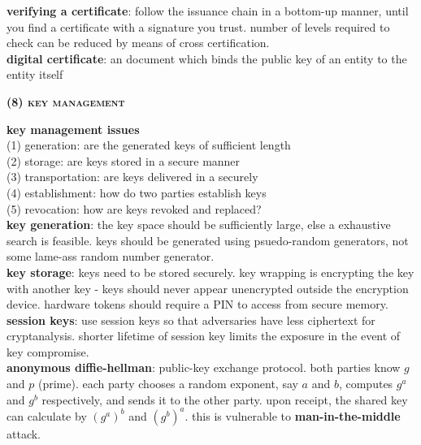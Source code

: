 \documentclass[a4paper]{article}
\begin{document}
\begin{multicols}{2}
\begin{framed}
	\noindent
	\textbf{verifying a certificate}: follow the issuance chain in a bottom-up manner, until you find a certificate with a signature you trust. number of levels required to check can be reduced by means of cross certification.\\
	
	\noindent
	\textbf{digital certificate}: an document which binds the public key of an entity to the entity itself
\end{framed}

\begin{framed}
	\begin{center}
		\textbf{\textsc{(8) key management}}
	\end{center}
	
	\noindent
	\textbf{key management issues}\\
	(1) generation: are the generated keys of sufficient length\\
	(2) storage: are keys stored in a secure manner\\
	(3) transportation: are keys delivered in a securely\\
	(4) establishment: how do two parties establish keys\\
	(5) revocation: how are keys revoked and replaced?\\
	
	\noindent
	\textbf{key generation}: the key space should be sufficiently large, else a exhaustive search is feasible. keys should be generated using psuedo-random generators, not some lame-ass random number generator.\\
	
	\noindent
	\textbf{key storage}: keys need to be stored securely. key wrapping is encrypting the key with another key - keys should never appear unencrypted outside the encryption device. hardware tokens should require a PIN to access from secure memory.\\
	
	\noindent
	\textbf{session keys}: use session keys so that adversaries have less ciphertext for cryptanalysis. shorter lifetime of session key limits the exposure in the event of key compromise.\\
	
	\noindent
	\textbf{anonymous diffie-hellman}: public-key exchange protocol. both parties know $g$ and $p$ (prime). each party chooses a random exponent, say $a$ and $b$, computes $g^a$ and $g^b$ respectively, and sends it to the other party. upon receipt, the shared key can calculate by $(g^a)^b$ and $(g^b)^a$. this is vulnerable to \textbf{man-in-the-middle} attack.\\
	

\end{framed}
\end{multicols}
\end{document}
